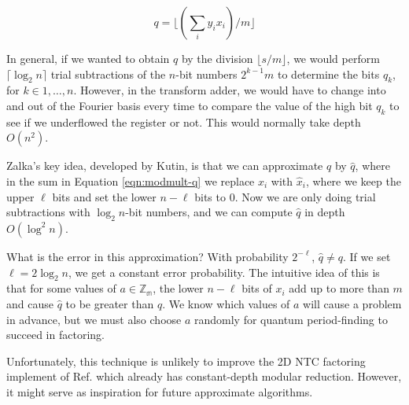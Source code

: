 \begin{equation}
q = \lfloor ( \sum_{i} y_i x_i ) / m \rfloor
\label{eqn:modmult-q}
\end{equation}

In general, if we wanted to obtain $q$ by the division $\lfloor s/m \rfloor$,
we would perform $\lceil \log_2 n \rceil$ trial subtractions of the
$n$-bit numbers $2^{k-1} m$ to determine the
bits $q_k$, for $k \in {1, \ldots, n}$. However, in the transform adder,
we would have to change into and out of the Fourier basis every time to
compare the value of the high bit $q_k$ to see if we underflowed the register
or not. This would normally take depth $O(n^2)$.

Zalka's key idea, developed by Kutin, is that we can approximate $q$ by
$\hat{q}$, where in the sum in Equation \ref{eqn:modmult-q} we replace
$x_i$ with $\hat{x}_i$, where we keep the upper $\ell$ bits and set the
lower $n - \ell$ bits to 0. Now we are only doing trial subtractions with
$\log_2 n$-bit numbers, and we can compute $\hat{q}$ in depth $O(\log^2 n)$.

What is the error in this approximation? With probability $2^{-\ell}$,
$\hat{q} \ne q$. If we set $\ell = 2\log_2 n$, we get a constant error
probability. The intuitive idea of this is that for some values of
$a \in \mathbb{Z_m}$, the lower $n - \ell$ bits of $x_i$ add up to more than
$m$ and cause $\hat{q}$ to be greater than $q$. We know which values of $a$
will cause a problem in advance, but we must also choose $a$ randomly for
quantum period-finding to succeed in factoring.

Unfortunately, this technique is unlikely to improve the 2D NTC factoring implement of
Ref. \cite{Pham2012b} which already has constant-depth modular reduction.
However, it might serve as inspiration for future approximate algorithms.



